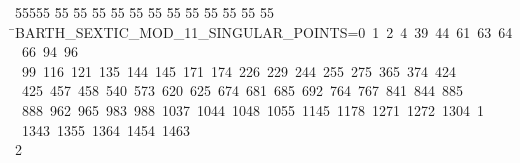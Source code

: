 %
%
\begin{tabbing}
55555 \= 55 \= 55 \= 55 \= 55 \= 55 \= 55 \= 55 \= 55 \= 55 \= 55 \= 55 \= 55 \= \>BARTH\_SEXTIC\_MOD\_11\_SINGULAR\_POINTS=0\ 1\ 2\ 4\ 39\ 44\ 61\ 63\ 64\ 66\ 94\ 96\ \\[0pt]
\ 99\ 116\ 121\ 135\ 144\ 145\ 171\ 174\ 226\ 229\ 244\ 255\ 275\ 365\ 374\ 424\\[0pt]
\>\ 425\ 457\ 458\ 540\ 573\ 620\ 625\ 674\ 681\ 685\ 692\ 764\ 767\ 841\ 844\ 885\\[0pt]
\>\ 888\ 962\ 965\ 983\ 988\ 1037\ 1044\ 1048\ 1055\ 1145\ 1178\ 1271\ 1272\ 1304\ 1\\[0pt]
\ 1343\ 1355\ 1364\ 1454\ 1463\\[0pt]
2\>\end{tabbing}
